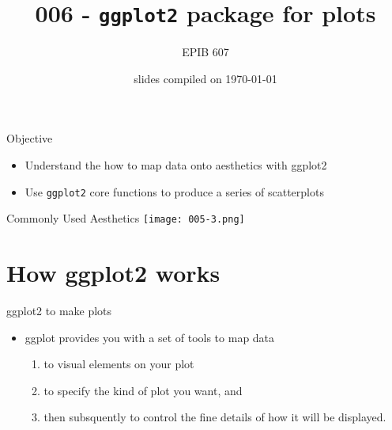 \documentclass[10pt]{beamer}\usepackage[]{graphicx}\usepackage[]{color}
\begin{document}
	

	
	
	\title{006 - \texttt{ggplot2} package for plots}
	\author{EPIB 607}
	
	\date{slides compiled on \today}
	
	\maketitle
	
	\begin{frame}{Objective}
	\begin{itemize}
		\item Understand the how to map data onto aesthetics with ggplot2
		\item Use \texttt{ggplot2} core functions to produce a series of scatterplots
	\end{itemize}
	\end{frame}

\begin{frame}{Commonly Used Aesthetics}
	\centering
	\texttt{[image: 005-3.png]}
\end{frame}

\section{How ggplot2 works}
	
		\begin{frame}{ggplot2 to make plots}
		\begin{itemize}
			\item ggplot provides you with a set of	tools to map data 
			\begin{enumerate}
				\item to visual elements on your plot
				\item to specify the kind of plot you want, and 
				\item then subsquently to control the fine details of how it will be displayed.
			\end{enumerate}
		\end{itemize}
	\end{frame}
\end{document}
